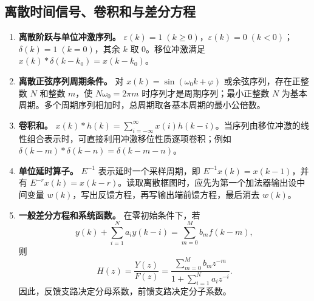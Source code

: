 \documentclass[12pt,a4paper]{ctexart}
\newcommand{\eps}{\varepsilon}
\begin{document}
\subsection{离散时间信号、卷积和与差分方程}
\begin{enumerate}
\item \textbf{离散阶跃与单位冲激序列。} \(\displaystyle \eps(k)=1\;(k\ge0)\)，\(\displaystyle \eps(k)=0\;(k<0)\)；\(\displaystyle \delta(k)=1\;(k=0)\)，其余 $k$ 取 $0$。移位冲激满足 \(\displaystyle x(k)*\delta(k-k_0)=x(k-k_0)\)。

\item \textbf{离散正弦序列周期条件。} 对 \(\displaystyle x(k)=\sin(\omega_0k+\varphi)\) 或余弦序列，存在正整数 $N$ 和整数 $m$，使 \(\displaystyle N\omega_0=2\pi m\) 时序列才是周期序列；最小正整数 $N$ 为基本周期。多个周期序列相加时，总周期取各基本周期的最小公倍数。

\item \textbf{卷积和。} \(\displaystyle x(k)*h(k)=\sum_{i=-\infty}^{\infty}x(i)h(k-i)\)。当序列由移位冲激的线性组合表示时，可直接利用冲激移位性质逐项卷积；例如 \(\displaystyle \delta(k-m)*\delta(k-n)=\delta(k-m-n)\)。

\item \textbf{单位延时算子。} $E^{-1}$ 表示延时一个采样周期，即 \(\displaystyle E^{-1}x(k)=x(k-1)\)，并有 \(\displaystyle E^{-r}x(k)=x(k-r)\)。读取离散框图时，应先为第一个加法器输出设中间变量 $w(k)$，写出反馈方程，再写输出端前馈方程，最后消去 $w(k)$。

\item \textbf{一般差分方程和系统函数。} 在零初始条件下，若 \[y(k)+\sum_{i=1}^{N}a_i y(k-i)=\sum_{m=0}^{M}b_m f(k-m),\] 则 \[H(z)=\frac{Y(z)}{F(z)}=\frac{\sum_{m=0}^{M}b_mz^{-m}}{1+\sum_{i=1}^{N}a_i z^{-i}}.\] 因此，反馈支路决定分母系数，前馈支路决定分子系数。
\end{enumerate}
\end{document}
